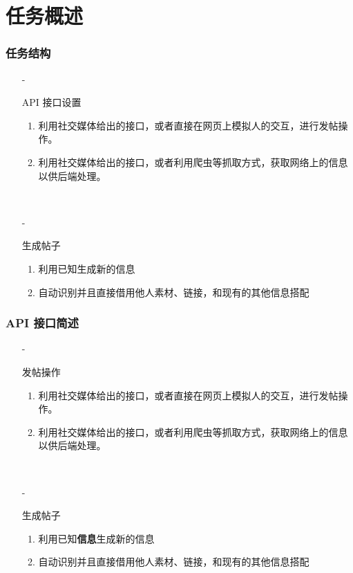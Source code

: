 \documentclass[10pt]{beamer}
\begin{document}
    \section*{任务概述}
        \begin{frame}
            \frametitle{任务结构}
            \begin{itemize}
                \item[-]{
                    API 接口设置
                    \begin{enumerate}
                        \item 利用社交媒体给出的接口，或者直接在网页上模拟人的交互，进行发帖操作。
                        \item 利用社交媒体给出的接口，或者利用爬虫等抓取方式，获取网络上的信息以供后端处理。
                    \end{enumerate}
                    \hspace*{\fill}\\
                    }
                \item[-]{
                    生成帖子
                    \begin{enumerate}
                        \item 利用已知生成新的信息
                        \item 自动识别并且直接借用他人素材、链接，和现有的其他信息搭配
                    \end{enumerate}
                    } 
            \end{itemize}
        \end{frame}


        \begin{frame}
            \frametitle{API 接口简述}
            \begin{itemize}
                \item[-]{
                    发帖操作
                    \begin{enumerate}
                        \item 利用社交媒体给出的接口，或者直接在网页上模拟人的交互，进行发帖操作。
                        \item 利用社交媒体给出的接口，或者利用爬虫等抓取方式，获取网络上的信息以供后端处理。
                    \end{enumerate}
                    \hspace*{\fill}\\
                    }
                \item[-]{
                    生成帖子
                    \begin{enumerate}
                        \item 利用已知\textbf{信息}生成新的信息
                        \item 自动识别并且直接借用他人素材、链接，和现有的其他信息搭配
                    \end{enumerate}
                    } 
            \end{itemize}
        \end{frame}
\end{document}
